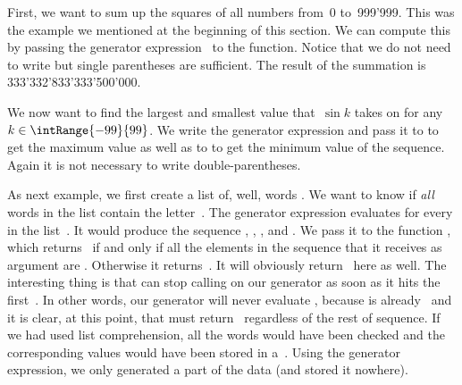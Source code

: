 First, we want to sum up the squares of all numbers from~0 to~999'999.
This was the example we mentioned at the beginning of this section.
We can compute this by passing the generator expression~ to the  function.
Notice that we do not need to write  but single parentheses are sufficient.
The result of the summation is 333'332'833'333'500'000.

We now want to find the largest and smallest value that~$\sin{k}$ takes on for any~$k\in\intRange{-99}{99}$.
We write the generator expression  and pass it to  to get the maximum value as well as to  to get the minimum value of the sequence.
Again it is not necessary to write double-parentheses.%
%
\begin{sloppypar}%
As next example, we first create a list  of, well, words .
We want to know if \emph{all} words in the list contain the letter~.
The generator expression  evaluates  for every  in the list~.
It would produce the sequence , , , and .
We pass it to the function , which returns~ if and only if all the elements in the sequence that it receives as argument are .
Otherwise it returns~.
It will obviously return~ here as well.
The interesting thing is that  can stop calling  on our generator as soon as it hits the first~.
In other words, our generator will never evaluate , because  is already~ and it is clear, at this point, that  must return~ regardless of the rest of sequence.
If we had used list comprehension, all the words would have been checked and the corresponding  values would have been stored in a~.
Using the generator expression, we only generated a part of the data (and stored it nowhere).%
\end{sloppypar}%
%
